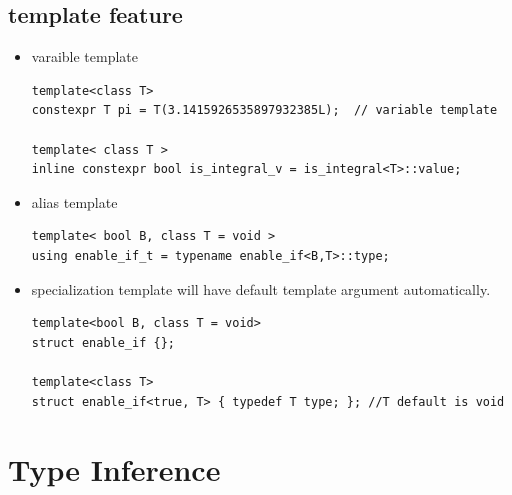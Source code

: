 \documentclass[a4paper,11pt,twoside]{book}
\begin{document}
\subsection{template feature}
\begin{itemize}
	\item varaible template
\begin{lstlisting}[numbers=none]
template<class T>
constexpr T pi = T(3.1415926535897932385L);  // variable template	

template< class T >
inline constexpr bool is_integral_v = is_integral<T>::value;
\end{lstlisting}

	\item alias template
\begin{lstlisting}[numbers=none]
template< bool B, class T = void >
using enable_if_t = typename enable_if<B,T>::type;
\end{lstlisting}
	
	\item specialization template will have default template argument automatically.
\begin{lstlisting}[numbers=none]
template<bool B, class T = void>
struct enable_if {};

template<class T>
struct enable_if<true, T> { typedef T type; }; //T default is void
\end{lstlisting}
	
\end{itemize}

\section{Type Inference}
\end{document}
